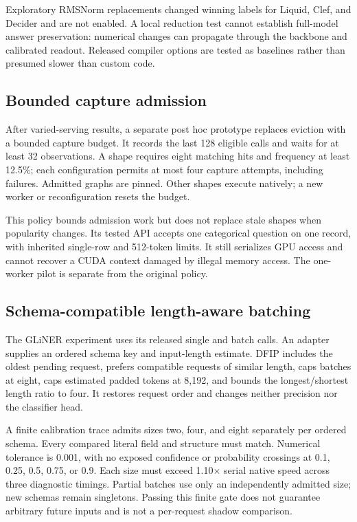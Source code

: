 \documentclass[10pt,twocolumn]{article}
\begin{document}
Exploratory RMSNorm replacements changed winning labels for Liquid, Clef, and Decider and are not enabled. A local reduction test cannot establish full-model answer preservation: numerical changes can propagate through the backbone and calibrated readout. Released compiler options are tested as baselines rather than presumed slower than custom code.

\subsection{Bounded capture admission}
After varied-serving results, a separate post hoc prototype replaces eviction with a bounded capture budget. It records the last 128 eligible calls and waits for at least 32 observations. A shape requires eight matching hits and frequency at least 12.5\%; each configuration permits at most four capture attempts, including failures. Admitted graphs are pinned. Other shapes execute natively; a new worker or reconfiguration resets the budget.

This policy bounds admission work but does not replace stale shapes when popularity changes. Its tested API accepts one categorical question on one record, with inherited single-row and 512-token limits. It still serializes GPU access and cannot recover a CUDA context damaged by illegal memory access. The one-worker pilot is separate from the original policy.

\subsection{Schema-compatible length-aware batching}
The GLiNER experiment uses its released single and batch calls. An adapter supplies an ordered schema key and input-length estimate. DFIP includes the oldest pending request, prefers compatible requests of similar length, caps batches at eight, caps estimated padded tokens at 8,192, and bounds the longest/shortest length ratio to four. It restores request order and changes neither precision nor the classifier head.

A finite calibration trace admits sizes two, four, and eight separately per ordered schema. Every compared literal field and structure must match. Numerical tolerance is 0.001, with no exposed confidence or probability crossings at 0.1, 0.25, 0.5, 0.75, or 0.9. Each size must exceed 1.10$\times$ serial native speed across three diagnostic timings. Partial batches use only an independently admitted size; new schemas remain singletons. Passing this finite gate does not guarantee arbitrary future inputs and is not a per-request shadow comparison.
\end{document}
